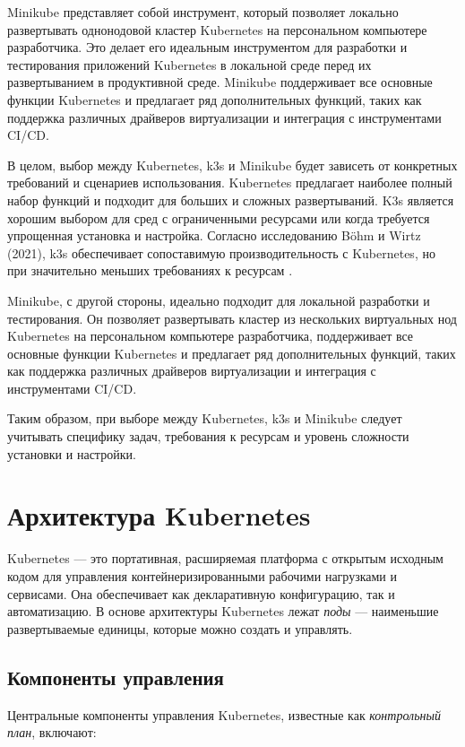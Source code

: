 Minikube представляет собой инструмент, который позволяет локально
развертывать однонодовой кластер Kubernetes на персональном компьютере
разработчика. Это делает его идеальным инструментом для разработки и 
тестирования приложений Kubernetes в локальной среде перед их
развертыванием в продуктивной среде. Minikube поддерживает все
основные функции Kubernetes и предлагает ряд дополнительных функций,
таких как поддержка различных драйверов виртуализации и интеграция с
инструментами CI/CD.

В целом, выбор между Kubernetes, k3s и Minikube будет зависеть от
конкретных требований и сценариев использования. Kubernetes предлагает
наиболее полный набор функций и подходит для больших и сложных
развертываний. K3s является хорошим выбором для сред с
ограниченными ресурсами или когда требуется упрощенная установка и
настройка. Согласно исследованию Böhm и Wirtz (2021), k3s обеспечивает
сопоставимую производительность с Kubernetes, но при значительно меньших
требованиях к ресурсам \cite{bohm2021profiling}.

Minikube, с другой стороны, идеально подходит для локальной
разработки и тестирования. Он позволяет развертывать кластер из нескольких
виртуальных нод Kubernetes на персональном компьютере разработчика,
поддерживает все основные функции Kubernetes и предлагает ряд
дополнительных функций, таких как поддержка различных драйверов
виртуализации и интеграция с инструментами CI/CD.

Таким образом, при выборе между Kubernetes, k3s и
Minikube следует учитывать специфику задач, требования
к ресурсам и уровень сложности установки и настройки.


\section{Архитектура Kubernetes}

Kubernetes — это портативная, расширяемая платформа с открытым исходным кодом
для управления контейнеризированными рабочими нагрузками и сервисами. Она
обеспечивает как декларативную конфигурацию, так и автоматизацию. В основе
архитектуры Kubernetes лежат \textit{поды} — наименьшие развертываемые единицы,
которые можно создать и управлять. \cite{nocentino2021kubernetes}

\subsection*{Компоненты управления}
Центральные компоненты управления Kubernetes, известные как \textit{контрольный
план}, включают:

